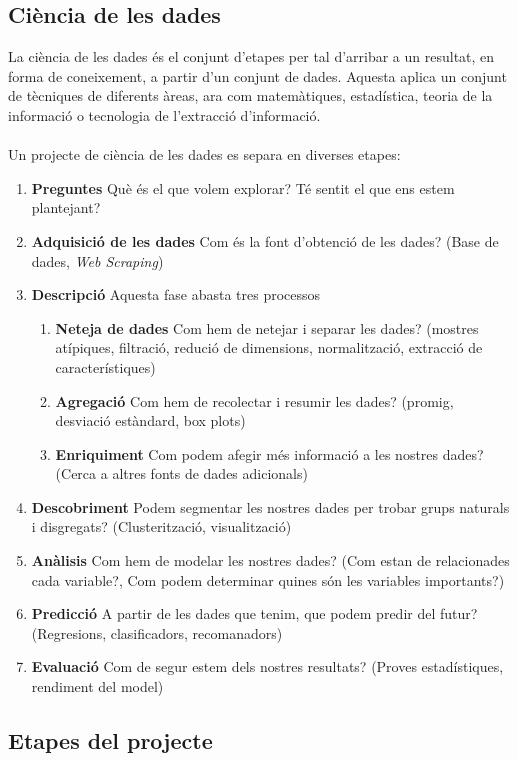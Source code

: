 \documentclass[12pt,a4paper,catalan]{article}
\begin{document}
\subsection{Ciència de les dades}
La ciència de les dades és el conjunt d'etapes per tal d'arribar a un resultat, en forma de coneixement, a partir d'un conjunt de dades. Aquesta aplica un conjunt de tècniques de diferents àreas, ara com matemàtiques, estadística, teoria de la informació o tecnologia de l'extracció d'informació.
\\
\\
Un projecte de ciència de les dades es separa en diverses etapes:
\begin{enumerate}
	\item \textbf{Preguntes} Què és el que volem explorar? Té sentit el que ens estem plantejant?
	\item \textbf{Adquisició de les dades} Com és la font d'obtenció de les dades? (Base de dades, \textit{Web Scraping})
	\item \textbf{Descripció} Aquesta fase abasta tres processos
	\begin{enumerate}
		\item \textbf{Neteja de dades} Com hem de netejar i separar les dades? (mostres atípiques, filtració, redució de dimensions, normalització, extracció de característiques)
		\item \textbf{Agregació} Com hem de recolectar i resumir les dades? (promig, desviació estàndard, box plots)
		\item \textbf{Enriquiment} Com podem afegir més informació a les nostres dades? (Cerca a altres fonts de dades adicionals)
	\end{enumerate}
	\item \textbf{Descobriment} Podem segmentar les nostres dades per trobar grups naturals i disgregats? (Clusterització, visualització)
	\item \textbf{Anàlisis} Com hem de modelar les nostres dades? (Com estan de relacionades cada variable?, Com podem determinar quines són les variables importants?)
	\item \textbf{Predicció} A partir de les dades que tenim, que podem predir del futur? (Regresions, clasificadors, recomanadors)
	\item \textbf{Evaluació} Com de segur estem dels nostres resultats? (Proves estadístiques, rendiment del model)
\end{enumerate}

\newpage

\subsection{Etapes del projecte}
\end{document}
